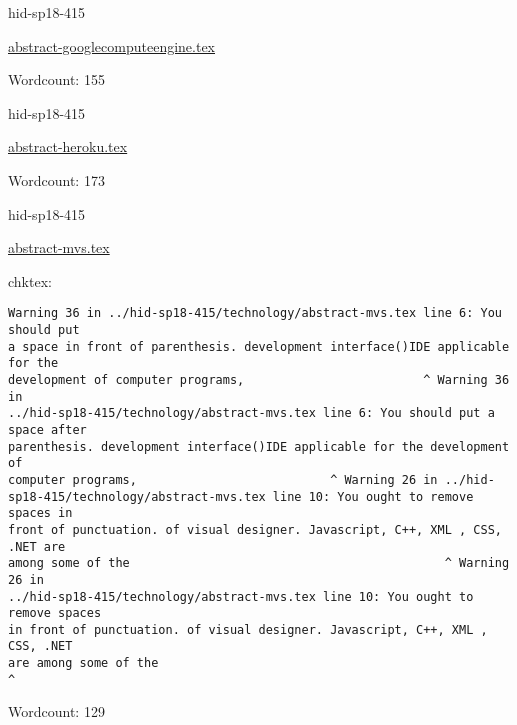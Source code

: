 

\begin{IU}

hid-sp18-415

\href{https://github.com/cloudmesh-community/hid-sp18-415/blob/master//technology/abstract-googlecomputeengine.tex}{abstract-googlecomputeengine.tex}

 

Wordcount: 155

\end{IU}



\begin{IU}

hid-sp18-415

\href{https://github.com/cloudmesh-community/hid-sp18-415/blob/master//technology/abstract-heroku.tex}{abstract-heroku.tex}

 

Wordcount: 173

\end{IU}



\begin{IU}

hid-sp18-415

\href{https://github.com/cloudmesh-community/hid-sp18-415/blob/master//technology/abstract-mvs.tex}{abstract-mvs.tex}

 
chktex:
\begin{tiny}
\begin{verbatim}
Warning 36 in ../hid-sp18-415/technology/abstract-mvs.tex line 6: You should put
a space in front of parenthesis. development interface()IDE applicable for the
development of computer programs,                         ^ Warning 36 in
../hid-sp18-415/technology/abstract-mvs.tex line 6: You should put a space after
parenthesis. development interface()IDE applicable for the development of
computer programs,                           ^ Warning 26 in ../hid-
sp18-415/technology/abstract-mvs.tex line 10: You ought to remove spaces in
front of punctuation. of visual designer. Javascript, C++, XML , CSS, .NET are
among some of the                                            ^ Warning 26 in
../hid-sp18-415/technology/abstract-mvs.tex line 10: You ought to remove spaces
in front of punctuation. of visual designer. Javascript, C++, XML , CSS, .NET
are among some of the                                                   ^
\end{verbatim}
\end{tiny}

Wordcount: 129

\end{IU}

